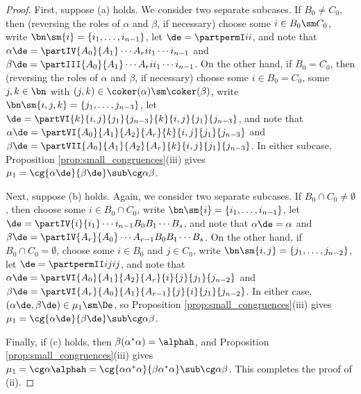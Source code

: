 \begin{proof}
First, suppose (a) holds.  We consider two separate subcases.  If $B_0\not=C_0$, then (reversing the roles of $\alpha$ and $\beta$, if necessary) choose some $i\in B_0\sm C_0$, write $\bn\sm\{i\}=\{i_1,\ldots,i_{n-1}\}$, let $\de=\partpermI ii$,
and note that $\alpha\de=\partIV{A_0}{A_1}\cdots{A_r}{i}{i_1}\cdots{i_{n-1}}$ and $\beta\de=\partIII{A_0}{A_1}\cdots{A_r}{i}{i_1}\cdots{i_{n-1}}$.
On the other hand, if $B_0=C_0$, then (reversing the roles of $\alpha$ and $\beta$, if necessary) choose some $i\in B_0=C_0$, some $j,k\in\bn$ with $(j,k)\in\coker(\alpha)\sm\coker(\beta)$, write $\bn\sm\{i,j,k\}=\{j_1,\ldots,j_{n-3}\}$, let $\de=\partVI{k}{i,j}{j_1}{j_{n-3}}{k}{i,j}{j_1}{j_{n-3}}$,
and note that $\alpha\de=\partVI{A_0}{A_1}{A_2}{A_r}{k}{i,j}{j_1}{j_{n-3}}$ and $\beta\de=\partVII{A_0}{A_1}{A_2}{A_r}{k}{i,j}{j_1}{j_{n-3}}$.
In either subcase, Proposition \ref{prop:small_congruences}(iii) gives $\mu_1=\cg{\alpha\de}{\beta\de}\sub\cg\alpha\beta$.

Next, suppose (b) holds.  Again, we consider two separate subcases.  If $B_0\cap C_0\not=\emptyset$, then choose some ${i\in B_0\cap C_0}$, write $\bn\sm\{i\}=\{i_1,\ldots,i_{n-1}\}$, let $\de=\partIV{i}{i_1}\cdots{i_{n-1}}{B_0}{B_1}\cdots{B_s}$,
and note that $\alpha\de=\alpha $ and $\beta\de=\partIV{A_r}{A_0}\cdots{A_{r-1}}{B_0}{B_1}\cdots{B_s}$.
On the other hand, if 
$B_0\cap C_0=\emptyset$, choose some $i\in B_0$ and $j\in C_0$, write $\bn\sm\{i,j\}=\{j_1,\ldots,j_{n-2}\}$, let 
$\de=\partpermII ijij$, 
and note that $\alpha\de=\partVI{A_0}{A_1}{A_2}{A_r}{i}{j}{j_1}{j_{n-2}}$ and $\beta\de=\partVI{A_r}{A_0}{A_1}{A_{r-1}}{j}{i}{j_1}{j_{n-2}}$.
In either case, $(\alpha\de,\beta\de)\in\mu_1\sm\De$, so Proposition \ref{prop:small_congruences}(iii) gives $\mu_1=\cg{\alpha\de}{\beta\de}\sub\cg\alpha\beta$.

Finally, if (c) holds, then $\beta(\alpha^*\alpha)=\alphah$, and Proposition \ref{prop:small_congruences}(iii) gives $\mu_1=\cg\alpha{\alphah}=\cg{\alpha\alpha^*\alpha}{\beta\alpha^*\alpha}\sub\cg\alpha\beta$.
%
This completes the proof of (ii).


\end{proof}
